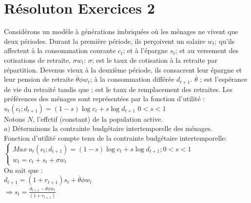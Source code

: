 \documentclass[11pt,twoside,a4paper]{article}
\begin{document}
  \section*{Résoluton Exercices 2}
  
  Considérons un modèle à générations imbriquées où les ménages ne vivent que deux périodes. Durant la première période, ils perçoivent un salaire $w_t$; qu'ils affectent à la  consommation courante $c_t$; et à l'épargne $s_t$; et au versement des cotisations de retraite, $\sigma w_t$: $\sigma$; est le taux de cotisation à la retraite par répartition. Devenus vieux à la deuxième période, ils consacrent leur épargne et leur pension de retraite $\overline{\theta}\phi w_t$; à la consommation différée $d_{t+1}$.
$\overline{\theta}$ ; est l'espérance de vie du retraité tandis que ; est le taux de remplacement
des retraites. Les préférences des ménages sont représentées par la fonction d'utilité :\\
$u_t(c_t; d_{t+1})=(1-s)\log{c_t} + s\log{d_{t+1}}$ \: $0<s<1$
\\
Notons $N$, l'effctif (constant) de la population active.\\
$a)$ Déterminons la contrainte budgétaire intertemporelle des ménages.\\

Fonction d'utilité compte tenu de la contrainte budgétaire intertemporelle:\\

$ \left\{\begin{array}{rl}
 Max \ u_t(c_t; d_{t+1})=  (1-s)\log{c_t} + s\log{d_{t+1}} ; 0<s<1 \\
 
w_t  =  c_t + s_t +  \sigma w_t \end{array}\right. $  \\

On sait que :\\

$d_{t+1}=(1+r_{t+1})s_t+\overline{\theta}\phi w_t$\\

  $
\Rightarrow s_t=\frac{d_{t+1}-\overline{\theta}\phi w_t}{(1+r_{t+1})}$\\

 
\end{document}
